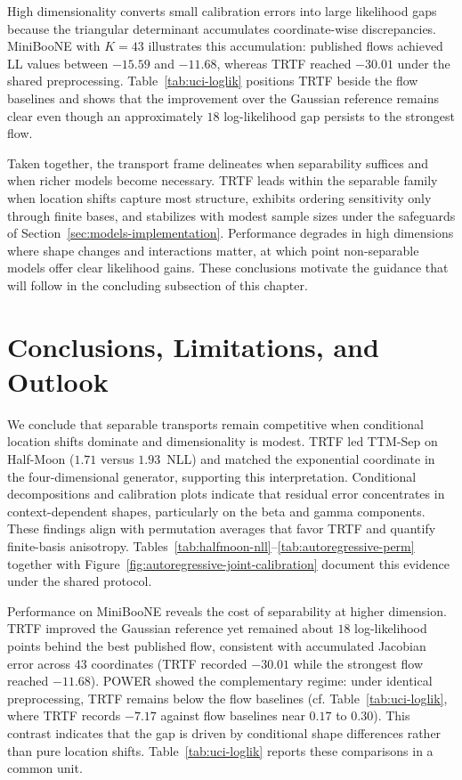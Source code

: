 \documentclass[11pt,a4paper,twoside]{book}\usepackage[]{graphicx}\usepackage[]{xcolor}
\begin{document}
High dimensionality converts small calibration errors into large likelihood gaps because the triangular determinant accumulates coordinate-wise discrepancies. MiniBooNE with $K=43$ illustrates this accumulation: published flows achieved LL values between $-15.59$ and $-11.68$, whereas TRTF reached $-30.01$ under the shared preprocessing. Table~\ref{tab:uci-loglik} positions TRTF beside the flow baselines and shows that the improvement over the Gaussian reference remains clear even though an approximately $18$ log-likelihood gap persists to the strongest flow.


Taken together, the transport frame delineates when separability suffices and when richer models become necessary. TRTF leads within the separable family when location shifts capture most structure, exhibits ordering sensitivity only through finite bases, and stabilizes with modest sample sizes under the safeguards of Section~\ref{sec:models-implementation}. Performance degrades in high dimensions where shape changes and interactions matter, at which point non-separable models offer clear likelihood gains. These conclusions motivate the guidance that will follow in the concluding subsection of this chapter.

\section{Conclusions, Limitations, and Outlook}\label{sec:conclusion-outlook}
We conclude that separable transports remain competitive when conditional location shifts dominate and dimensionality is modest. TRTF led TTM-Sep on Half-Moon ($1.71$ versus $1.93$~NLL) and matched the exponential coordinate in the four-dimensional generator, supporting this interpretation. Conditional decompositions and calibration plots indicate that residual error concentrates in context-dependent shapes, particularly on the beta and gamma components. These findings align with permutation averages that favor TRTF and quantify finite-basis anisotropy. Tables~\ref{tab:halfmoon-nll}--\ref{tab:autoregressive-perm} together with Figure~\ref{fig:autoregressive-joint-calibration} document this evidence under the shared protocol.

Performance on MiniBooNE reveals the cost of separability at higher dimension. TRTF improved the Gaussian reference yet remained about $18$ log-likelihood points behind the best published flow, consistent with accumulated Jacobian error across $43$ coordinates (TRTF recorded $-30.01$ while the strongest flow reached $-11.68$). POWER showed the complementary regime: under identical preprocessing, TRTF remains below the flow baselines (cf. Table~\ref{tab:uci-loglik}, where TRTF records $-7.17$ against flow baselines near $0.17$ to $0.30$). This contrast indicates that the gap is driven by conditional shape differences rather than pure location shifts. Table~\ref{tab:uci-loglik} reports these comparisons in a common unit.
\end{document}
